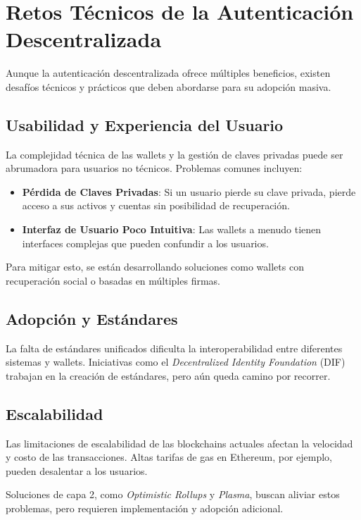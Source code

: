 \section{Retos Técnicos de la Autenticación Descentralizada}

Aunque la autenticación descentralizada ofrece múltiples beneficios, existen desafíos técnicos y prácticos que deben abordarse para su adopción masiva.

\subsection{Usabilidad y Experiencia del Usuario}

La complejidad técnica de las wallets y la gestión de claves privadas puede ser abrumadora para usuarios no técnicos. Problemas comunes incluyen:

\begin{itemize}
    \item \textbf{Pérdida de Claves Privadas}: Si un usuario pierde su clave privada, pierde acceso a sus activos y cuentas sin posibilidad de recuperación.
    \item \textbf{Interfaz de Usuario Poco Intuitiva}: Las wallets a menudo tienen interfaces complejas que pueden confundir a los usuarios.
\end{itemize}

Para mitigar esto, se están desarrollando soluciones como wallets con recuperación social o basadas en múltiples firmas.

\subsection{Adopción y Estándares}

La falta de estándares unificados dificulta la interoperabilidad entre diferentes sistemas y wallets. Iniciativas como el \textit{Decentralized Identity Foundation} (DIF) trabajan en la creación de estándares, pero aún queda camino por recorrer.

\subsection{Escalabilidad}

Las limitaciones de escalabilidad de las blockchains actuales afectan la velocidad y costo de las transacciones. Altas tarifas de gas en Ethereum, por ejemplo, pueden desalentar a los usuarios.

Soluciones de capa 2, como \textit{Optimistic Rollups} y \textit{Plasma}, buscan aliviar estos problemas, pero requieren implementación y adopción adicional.

